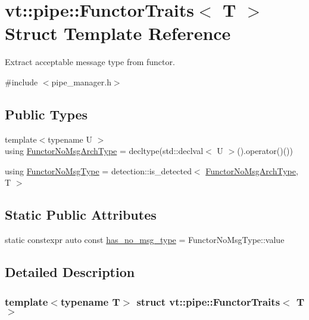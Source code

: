 \hypertarget{structvt_1_1pipe_1_1_functor_traits}{}\section{vt\+:\+:pipe\+:\+:Functor\+Traits$<$ T $>$ Struct Template Reference}
\label{structvt_1_1pipe_1_1_functor_traits}


Extract acceptable message type from functor.  




{\ttfamily \#include $<$pipe\+\_\+manager.\+h$>$}

\subsection*{Public Types}
\begin{DoxyCompactItemize}
\item 
{\footnotesize template$<$typename U $>$ }\\using \hyperlink{structvt_1_1pipe_1_1_functor_traits_af2002cb6723439f6b1e74c7a70255cc8}{Functor\+No\+Msg\+Arch\+Type} = decltype(std\+::declval$<$ U $>$().operator()())
\item 
using \hyperlink{structvt_1_1pipe_1_1_functor_traits_a2b729de8c328206718e4eea1d9b30f9b}{Functor\+No\+Msg\+Type} = detection\+::is\+\_\+detected$<$ \hyperlink{structvt_1_1pipe_1_1_functor_traits_af2002cb6723439f6b1e74c7a70255cc8}{Functor\+No\+Msg\+Arch\+Type}, T $>$
\end{DoxyCompactItemize}
\subsection*{Static Public Attributes}
\begin{DoxyCompactItemize}
\item 
static constexpr auto const \hyperlink{structvt_1_1pipe_1_1_functor_traits_aace8b00c70112f7711ce73f1799f7e00}{has\+\_\+no\+\_\+msg\+\_\+type} = Functor\+No\+Msg\+Type\+::value
\end{DoxyCompactItemize}


\subsection{Detailed Description}
\subsubsection*{template$<$typename T$>$\newline
struct vt\+::pipe\+::\+Functor\+Traits$<$ T $>$}

